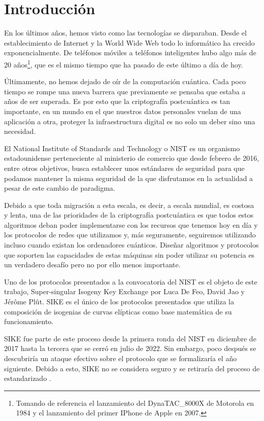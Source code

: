 \chapter{Introducción}\label{introduccion}

En los últimos años, hemos visto como las tecnologías se disparaban. Desde el establecimiento de Internet y la World Wide Web todo lo informático ha crecido exponencialmente. De teléfonos móviles a teléfonos inteligentes hubo algo más de 20 años\footnote{Tomando de referencia el lanzamiento del DynaTAC\_8000X de Motorola en 1984 y el lanzamiento del primer IPhone de Apple en 2007.}, que es el mismo tiempo que ha pasado de este último a día de hoy.

Últimamente, no hemos dejado de oír de la computación cuántica. Cada poco tiempo se rompe una nueva barrera que previamente se pensaba que estaba a años de ser superada. Es por esto que la criptografía postcuántica es tan importante, en un mundo en el que nuestros datos personales vuelan de una aplicación a otra, proteger la infraestructura digital es no solo un deber sino una necesidad.

El National Institute of Standards and Technology o NIST es un organismo estadounidense perteneciente al ministerio de comercio que desde febrero de 2016, entre otros objetivos, busca establecer unos estándares de seguridad para que podamos mantener la misma seguridad de la que disfrutamos en la actualidad a pesar de este cambio de paradigma.

Debido a que toda migración a esta escala, es decir, a escala mundial, es costosa y lenta, una de las prioridades de la criptografía postcuántica es que todos estos algoritmos deban poder implementarse con los recursos que tenemos hoy en día y los protocolos de redes que utilizamos y, más seguramente, seguiremos utilizando incluso cuando existan los ordenadores cuánticos. Diseñar algoritmos y protocolos que soporten las capacidades de estas máquinas sin poder utilizar su potencia es un verdadero desafío pero no por ello menos importante.

Uno de los protocolos presentados a la convocatoria del NIST es el objeto de este trabajo, Super-singular Isogeny Key Exchange por Luca De Feo, David Jao y Jérôme Plût. SIKE es el único de los protocolos presentados que utiliza la composición de isogenias de curvas elípticas como base matemática de su funcionamiento.

SIKE fue parte de este proceso desde la primera ronda del NIST en diciembre de 2017 hasta la tercera que se cerró en julio de 2022. Sin embargo, poco después se descubriría un ataque efectivo sobre el protocolo que se formalizaría el año siguiente. Debido a esto, SIKE no se considera seguro y se retiraría del proceso de estandarizado \cite{status_report} .

